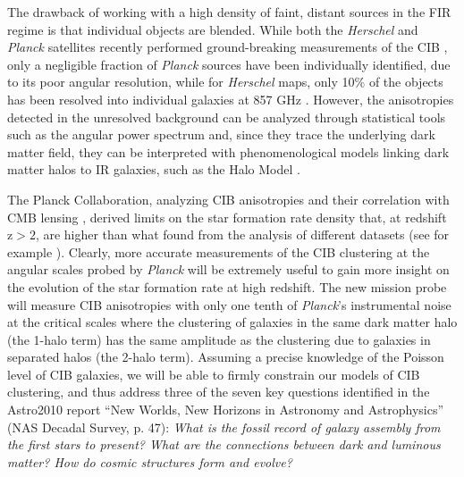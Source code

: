 The drawback of working with a
high density of faint, distant sources in the FIR regime is that
individual objects are blended. While both the {\it Herschel} and {\it Planck} satellites
recently performed ground-breaking measurements of the CIB
\citep{amblard2011,viero2013a,planck2014-XXX,mak2016}, only a
negligible fraction of {\it Planck} sources have been individually
identified, due to its poor angular resolution, while for
{\it Herschel} maps, only 10$\%$ of the objects
has been resolved into individual galaxies at 857 GHz \cite{bethermin2010}.
However, the anisotropies detected in the
unresolved background can be analyzed through statistical tools
such as the angular power spectrum \citep{knox2001} and, since they trace the
underlying dark matter field, they can be interpreted with
phenomenological models linking dark matter halos to IR galaxies,
such as the Halo Model \cite{cooray2002,shang2012}.

The Planck Collaboration, analyzing CIB anisotropies and their correlation with CMB lensing \citep{planck2014-XXX,planckXVIII},
derived limits on the star formation rate density that,
at redshift $\mathrm{z>2}$, are higher than what found from the analysis of
different datasets (see for example \cite{madau2014}).
Clearly, more accurate measurements of the CIB clustering at the
angular scales probed by {\it Planck} will be extremely useful to
gain more insight on the evolution of the star formation rate at
high redshift. The new mission probe will measure CIB anisotropies
with only one tenth of {\it Planck}'s instrumental noise at the critical
scales where the clustering of galaxies in the same dark matter
halo (the 1-halo term) has the same amplitude as the
clustering due to galaxies in separated halos
(the 2-halo term). Assuming a precise knowledge of the
Poisson level of CIB
galaxies, we will be able to firmly
constrain our models of CIB clustering,
and thus address three of the seven key questions
identified in the Astro2010 report
``New Worlds, New Horizons in Astronomy and Astrophysics''
(NAS Decadal Survey, p. 47):
{\it What is the fossil record of galaxy assembly                                                   
from the first stars to present? What are the connections                                           
between dark and luminous matter?
How do cosmic structures form and evolve?}

